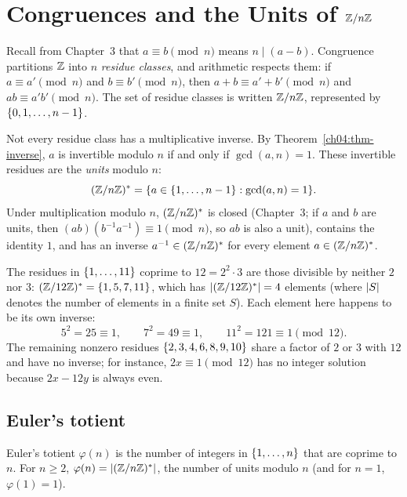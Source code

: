 \section{Congruences and the Units of $\mathbb{Z}/n\mathbb{Z}$}
\label{ch04:congruences}

Recall from Chapter~3 that $a \equiv b \pmod n$ means $n \mid (a - b)$. Congruence partitions $\mathbb{Z}$
into $n$ \emph{residue classes}, and arithmetic respects them: if $a \equiv a' \pmod n$ and
$b \equiv b' \pmod n$, then $a + b \equiv a' + b' \pmod n$ and $ab \equiv a'b' \pmod n$. The set of
residue classes is written $\mathbb{Z}/n\mathbb{Z}$, represented by $\{0, 1, \dots, n-1\}$.

Not every residue class has a multiplicative inverse. By Theorem~\ref{ch04:thm-inverse}, $a$ is
invertible modulo $n$ if and only if $\gcd(a, n) = 1$. These invertible residues are the
\emph{units} modulo $n$:
\[
  (\mathbb{Z}/n\mathbb{Z})^{*} = \{a \in \{1, \dots, n-1\} : \gcd(a, n) = 1\}.
\]
Under multiplication modulo $n$, $(\mathbb{Z}/n\mathbb{Z})^{*}$ is closed (Chapter~3; if $a$ and $b$ are units, then
$(ab)(b^{-1}a^{-1}) \equiv 1 \pmod n$, so $ab$ is also a unit), contains the identity $1$, and has
an inverse $a^{-1} \in (\mathbb{Z}/n\mathbb{Z})^{*}$ for every element $a \in (\mathbb{Z}/n\mathbb{Z})^{*}$.

\begin{example}
\label{ch04:ex-units-12}
The residues in $\{1, \dots, 11\}$ coprime to $12 = 2^2 \cdot 3$ are those divisible by neither
$2$ nor $3$: $(\mathbb{Z}/12\mathbb{Z})^{*} = \{1, 5, 7, 11\}$, which has $\lvert(\mathbb{Z}/12\mathbb{Z})^{*}\rvert = 4$ elements (where
$\lvert S\rvert$ denotes the number of elements in a finite set $S$). Each element here happens to be its
own inverse:
\[
  5^2 = 25 \equiv 1, \qquad 7^2 = 49 \equiv 1, \qquad 11^2 = 121 \equiv 1 \pmod{12}.
\]
The remaining nonzero residues $\{2,3,4,6,8,9,10\}$ share a factor of $2$ or $3$ with $12$ and
have no inverse; for instance, $2x \equiv 1 \pmod{12}$ has no integer solution because $2x - 12y$ is
always even.
\end{example}

\subsection*{Euler's totient}

\begin{definition}
\label{ch04:def-totient}
Euler's totient $\varphi(n)$ is the number of integers in $\{1, \dots, n\}$ that are coprime to
$n$. For $n \ge 2$, $\varphi(n) = \lvert(\mathbb{Z}/n\mathbb{Z})^{*}\rvert$, the number of units modulo $n$ (and for $n = 1$,
$\varphi(1) = 1$).
\end{definition}

